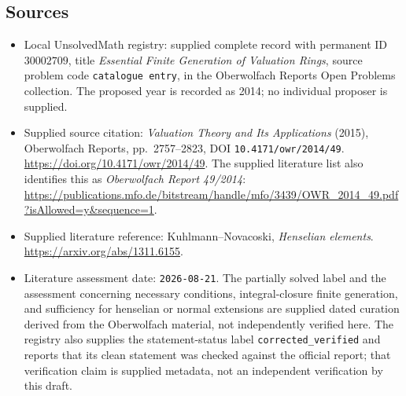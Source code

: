 \documentclass[11pt]{article}
\begin{document}
\subsection{Sources}
\begin{itemize}
\item Local UnsolvedMath registry: supplied complete record with permanent ID \(30002709\), title \emph{Essential Finite Generation of Valuation Rings}, source problem code \texttt{catalogue entry}, in the Oberwolfach Reports Open Problems collection. The proposed year is recorded as 2014; no individual proposer is supplied.
\item Supplied source citation: \emph{Valuation Theory and Its Applications} (2015), Oberwolfach Reports, pp.~2757--2823, DOI \texttt{10.4171/owr/2014/49}. \url{https://doi.org/10.4171/owr/2014/49}. The supplied literature list also identifies this as \emph{Oberwolfach Report 49/2014}: \url{https://publications.mfo.de/bitstream/handle/mfo/3439/OWR_2014_49.pdf?isAllowed=y&sequence=1}.
\item Supplied literature reference: Kuhlmann--Novacoski, \emph{Henselian elements}. \url{https://arxiv.org/abs/1311.6155}.
\item Literature assessment date: \texttt{2026-08-21}. The partially solved label and the assessment concerning necessary conditions, integral-closure finite generation, and sufficiency for henselian or normal extensions are supplied dated curation derived from the Oberwolfach material, not independently verified here. The registry also supplies the statement-status label \texttt{corrected\_verified} and reports that its clean statement was checked against the official report; that verification claim is supplied metadata, not an independent verification by this draft.
\end{itemize}
\end{document}

